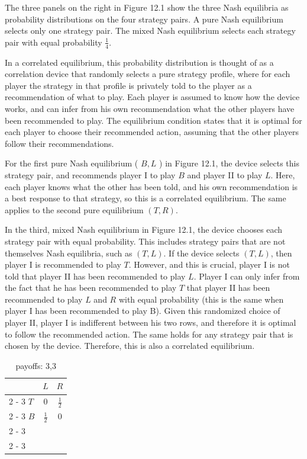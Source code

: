 \documentclass[12pt]{article}
\begin{document}
The three panels on the right in Figure 12.1 show the three Nash equilibria as probability distributions on the four strategy pairs. A pure Nash equilibrium selects only one strategy pair. The mixed Nash equilibrium selects each strategy pair with equal probability $\frac{1}{4}$.

In a correlated equilibrium, this probability distribution is thought of as a correlation device that randomly selects a pure strategy profile, where for each player the strategy in that profile is privately told to the player as a recommendation of what to play. Each player is assumed to know how the device works, and can infer from his own recommendation what the other players have been recommended to play. The equilibrium condition states that it is optimal for each player to choose their recommended action, assuming that the other players follow their recommendations.

For the first pure Nash equilibrium ( $B, L$ ) in Figure 12.1, the device selects this strategy pair, and recommends player I to play $B$ and player II to play $L$. Here, each player knows what the other has been told, and his own recommendation is a best response to that strategy, so this is a correlated equilibrium. The same applies to the second pure equilibrium $(T, R)$.

In the third, mixed Nash equilibrium in Figure 12.1, the device chooses each strategy pair with equal probability. This includes strategy pairs that are not themselves Nash equilibria, such as $(T, L)$. If the device selects $(T, L)$, then player I is recommended to play $T$. However, and this is crucial, player I is not told that player II has been recommended to play $L$. Player I can only infer from the fact that he has been recommended to play $T$ that player II has been recommended to play $L$ and $R$ with equal probability (this is the same when player I has been recommended to play B). Given this randomized choice of player II, player I is indifferent between his two rows, and therefore it is optimal to follow the recommended action. The same holds for any strategy pair that is chosen by the device. Therefore, this is also a correlated equilibrium.

\begin{table}[h]
\begin{center}
\begin{tabular}{l|c|c|}
 & \multicolumn{1}{c}{$L$} & \multicolumn{1}{c}{$R$} \\
\cline { 2 - 3 }
$T$ & 0 & $\frac{1}{2}$ \\
\cline { 2 - 3 }
$B$ & $\frac{1}{2}$ & 0 \\
\cline { 2 - 3 }
 &  &  \\
\cline { 2 - 3 }
\end{tabular}
\captionsetup{labelformat=empty}
\caption{payoffs: 3,3}
\end{center}
\end{table}
\end{document}
